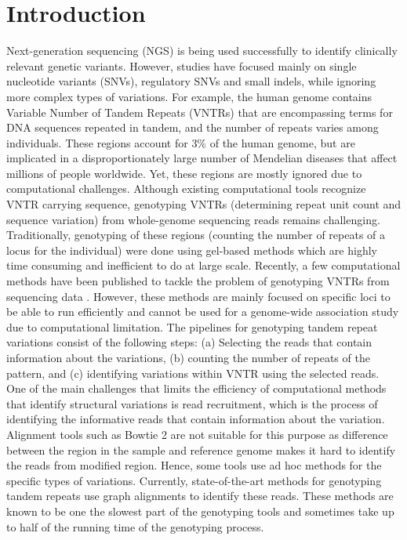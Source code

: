 \clearpage
\newpage
\section{Introduction}
\label{introduction}

Next-generation sequencing (NGS) is being used successfully to
identify clinically relevant genetic variants. However, studies have focused mainly
on single nucleotide variants (SNVs), regulatory SNVs and small
indels, while ignoring more complex types of variations. For example, the human genome contains Variable Number of Tandem Repeats (VNTRs) that are encompassing terms for DNA sequences
repeated in tandem, and the number of repeats varies among individuals. These regions account for 3\% of the human genome, but are
implicated in a disproportionately large number of Mendelian diseases
that affect millions of people worldwide\cite{Brookes2013, Capurso2010, Lalioti1997}. Yet, these regions are mostly ignored due to computational challenges. Although existing computational tools recognize VNTR carrying sequence, genotyping VNTRs (determining repeat unit count and sequence variation) from whole-genome sequencing reads remains challenging. Traditionally, genotyping of these regions (counting the number of repeats of a locus for the individual) were done using gel-based methods which are highly time consuming and inefficient to do at large scale. Recently, a few computational methods have been published to tackle the problem of genotyping VNTRs from sequencing data \cite{Bakhtiari2018, Gelfand2014}. However, these methods are mainly focused on specific loci to be able to run efficiently and cannot be used for a genome-wide association study due to computational limitation.
The pipelines for genotyping tandem repeat variations consist of the following steps: (a) Selecting the reads that contain information about the variations, (b) counting the number of repeats of the pattern, and (c) identifying variations within VNTR using the selected reads.
One of the main challenges that limits the efficiency of computational methods that identify structural variations is read recruitment, which is the process of identifying the informative reads that contain information about the variation. Alignment tools such as Bowtie 2 are not suitable for this purpose as difference between the region in the sample and reference genome makes it hard to identify the reads from modified region. Hence, some tools use ad hoc methods for the specific types of variations. Currently, state-of-the-art methods for genotyping tandem repeats use graph alignments to identify these reads. These methods are known to be one the slowest part of the genotyping tools and sometimes take up to half of the running time of the genotyping process.

